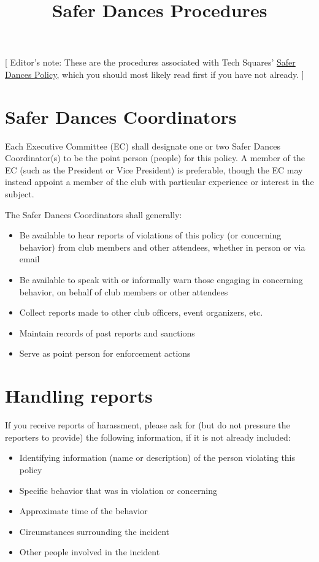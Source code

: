 \documentclass{article}
\title{Safer Dances Procedures}
\date{}
\newcommand{\baseurl}{\latexhtml{http://www.mit.edu/~tech-squares/govdocs/}{}}
\newcommand{\matchextension}{.\latexhtml{pdf}{html}}
\newcommand{\matchlink}[2]{\href{\baseurl#1\matchextension}{#2}}
\begin{document}
\maketitle

[ Editor's note: These are the procedures associated with Tech Squares' \matchlink{safer-dances}{Safer Dances Policy}, which you should most likely read first if you have not already. ]

\section{Safer Dances Coordinators}

Each Executive Committee (EC) shall designate one or two Safer Dances Coordinator(s) to be the point person (people) for this policy. A member of the EC (such as the President or Vice President) is preferable, though the EC may instead appoint a member of the club with particular experience or interest in the subject.

The Safer Dances Coordinators shall generally:
\begin{itemize}
\item Be available to hear reports of violations of this policy (or concerning behavior) from club members and other attendees, whether in person or via email
\item Be available to speak with or informally warn those engaging in concerning behavior, on behalf of club members or other attendees
\item Collect reports made to other club officers, event organizers, etc.
\item Maintain records of past reports and sanctions
\item Serve as point person for enforcement actions
\end{itemize}


\section{Handling reports}

If you receive reports of harassment, please ask for (but do not pressure the reporters to provide) the following information, if it is not already included:

\begin{itemize}
\item Identifying information (name or description) of the person violating this policy
\item Specific behavior that was in violation or concerning
\item Approximate time of the behavior
\item Circumstances surrounding the incident
\item Other people involved in the incident
\end{itemize}
\end{document}
